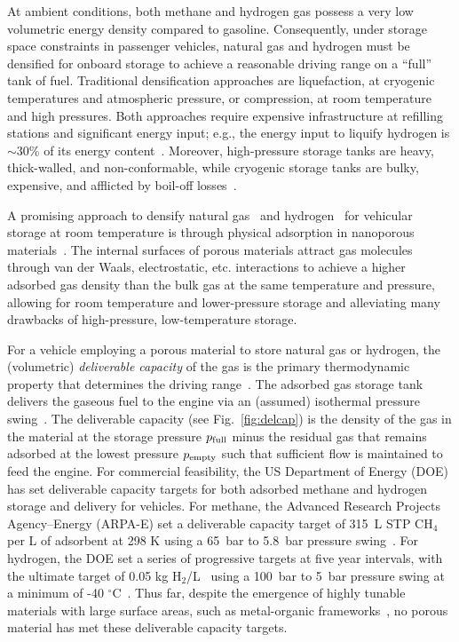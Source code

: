 At ambient conditions, both methane and hydrogen gas possess a very low
volumetric energy density compared to gasoline. Consequently, under storage
space constraints in passenger vehicles, natural gas and hydrogen must be
densified for onboard storage to achieve a reasonable driving range on a
``full'' tank of fuel. Traditional densification approaches are liquefaction,
at cryogenic temperatures and atmospheric pressure, or compression, at room
temperature and high pressures. Both approaches require expensive
infrastructure at refilling stations and significant energy input; e.g., the
energy input to liquify hydrogen is $\sim$30\% of its energy
content~\cite{bossel2003energy}. Moreover, high-pressure storage tanks are
heavy, thick-walled, and non-conformable, while cryogenic storage tanks are
bulky, expensive, and afflicted by boil-off losses~\cite{hasan2009minimizing}.

A promising approach to densify natural
gas~\cite{makal2012methane,mason2014evaluating} and
hydrogen~\cite{suh2011hydrogen,garcia2018benchmark} for vehicular storage at
room temperature is through physical adsorption in nanoporous
materials~\cite{schoedel2016role}. The internal surfaces of porous materials
attract gas molecules through van der Waals, electrostatic, etc. interactions
to achieve a higher adsorbed gas density than the bulk gas at the same
temperature and pressure, allowing for room temperature and lower-pressure
storage and alleviating many drawbacks of high-pressure, low-temperature
storage.

For a vehicle employing a porous material to store natural gas or hydrogen, the
(volumetric) \emph{deliverable capacity} of the gas is the primary
thermodynamic property that determines the driving
range~\cite{mason2014evaluating}. The adsorbed gas storage tank delivers the
gaseous fuel to the engine via an (assumed) isothermal pressure
swing~\cite{sircar2002pressure}. The deliverable capacity (see
Fig.~\ref{fig:delcap}) is the density of the gas in the material at the storage
pressure $p_{\text{full}}$ minus the residual gas that remains adsorbed at the lowest
pressure $p_{\text{empty}}$ such that sufficient flow is maintained to feed the engine.
For commercial feasibility, the US Department of Energy (DOE) has set
deliverable capacity targets for both adsorbed methane and hydrogen storage and
delivery for vehicles. For methane, the Advanced Research Projects
Agency--Energy (ARPA-E) set a deliverable capacity target of 315\ L STP CH$_4$
per L of adsorbent at 298 K using a 65\ bar to 5.8\ bar pressure
swing~\cite{simon2015materials}. For hydrogen, the DOE set a series of
progressive targets at five year intervals, with the ultimate target of 0.05 kg
H$_2$/L~\cite{h2targetsDOE} using a 100\ bar to 5\ bar pressure swing at a
minimum of -40 $^\circ$C~\cite{allendorf2018assessment}. Thus far, despite the
emergence of highly tunable materials with large surface areas, such as
metal-organic frameworks~\cite{furukawa2013chemistry}, no porous material has
met these deliverable capacity targets.

